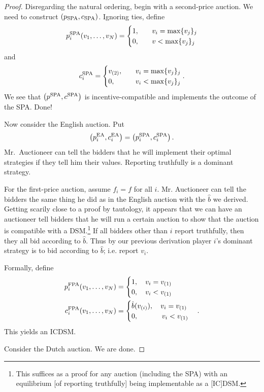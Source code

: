 \begin{proof}
	Disregarding the natural ordering, begin with a second-price auction. We need to construct $\left( p_{\text{SPA}}, c_{\text{SPA}} \right)$. Ignoring ties, define \[
		p_i^{\text{SPA}} (v_1,\ldots,v_N) = \begin{cases}
			1, \quad &v_i = \max \{v_j\}_{j} \\
			0, \quad &v < \max \{v_j\}_j
		\end{cases}
	\] and \[
		c_i^{\text{SPA}} = \begin{cases}
			v_{(2)}, \quad&v_i = \max \{v_j\}_j \\
			0,\quad &v_i < \max\{v_j\}_j
		\end{cases}
	.\]
	We see that $\left( p^{\text{SPA}}, c^{\text{SPA}} \right)$ is incentive-compatible and implements the outcome of the SPA. 
	Done!

		Now consider the English auction. Put
		\[
			\left( p_i^{\operatorname{EA}}, c_i^{\operatorname{EA}} \right) = \left( p_i^{\text{SPA}}, c_i^{\text{SPA}} \right).
		\]
		Mr.~Auctioneer can tell the bidders that he will implement their optimal strategies if they tell him their values.
		Reporting truthfully is a dominant strategy.

	For the first-price auction, assume $f_i = f$ for all $i$. Mr. Auctioneer can tell the bidders the same thing he did as in the English auction with the $\hat{b}$ we derived. Getting scarily close to a proof by tautology, it appears that we can have an auctioneer tell bidders that he will run a certain auction to show that the auction is compatible with a DSM.\footnote{This suffices as a proof for any auction (including the SPA) with an equilibrium [of reporting truthfully] being implementable as a [IC]DSM.} If all bidders other than $i$ report truthfully, then they all bid according to $\hat{b}$. Thus by our previous derivation player $i$'s dominant strategy is to bid according to $\hat{b}$; i.e. report $v_i$.
	
	Formally, define
	\begin{align*}
		p_i^{\text{FPA}}(v_1,\ldots,v_N) &= \begin{cases}
			1, \quad v_i = v_{(1)} \\
			0, \quad v_i < v_{(1)}
		\end{cases} \\
		c_i^{\text{FPA}}(v_1,\ldots,v_N) &= \begin{cases}
					\hat{b}(v_{(i)}), \quad v_i = v_{(1)} \\
					0,\ \quad\qquad v_i < v_{(1)}
				\end{cases}
	.\end{align*}
	This yields an ICDSM. 

	Consider the Dutch auction. We are done.
\end{proof}

